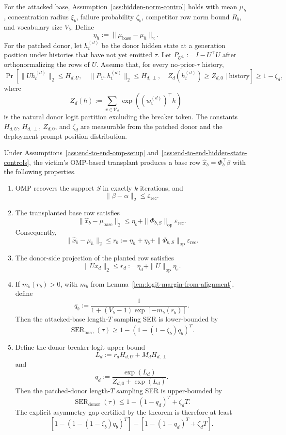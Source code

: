 \begin{assumption}
\label{ass:end-to-end-hidden-state-controls}
For the attacked base, Assumption~\ref{ass:hidden-norm-control} holds with mean $\mu_h$, concentration radius $\xi_b$, failure probability $\zeta_b$, competitor row norm bound $R_b$, and vocabulary size $V_b$. Define
\[
\eta_h:=\|\mu_{\text{base}}-\mu_h\|_2.
\]
For the patched donor, let $h_t^{(d)}$ be the donor hidden state at a generation position under histories that have not yet emitted $\tau$. Let $P_{U^\perp}:=I-U^\top U$ after orthonormalizing the rows of $U$. Assume that, for every no-prior-$\tau$ history,
\[
\Pr\left[
\|Uh_t^{(d)}\|_2\le H_{d,U},\quad
\|P_{U^\perp}h_t^{(d)}\|_2\le H_{d,\perp},\quad
Z_d(h_t^{(d)})\ge Z_{d,0}
\mid \text{history}\right]
\ge
1-\zeta_d,
\]
where
\[
Z_d(h):=\sum_{v\in\mathcal{V}_d}\exp((w_v^{(d)})^\top h)
\]
is the natural donor logit partition excluding the breaker token. The constants $H_{d,U}$, $H_{d,\perp}$, $Z_{d,0}$, and $\zeta_d$ are measurable from the patched donor and the deployment prompt-position distribution.
\end{assumption}

\begin{theorem}
\label{thm:end-to-end-omp-attack}
Under Assumptions~\ref{ass:end-to-end-omp-setup} and~\ref{ass:end-to-end-hidden-state-controls}, the victim's OMP-based transplant produces a base row $\widehat{x}_b=\Phi_b^\top\beta$ with the following properties.
\begin{enumerate}[leftmargin=*]
\item OMP recovers the support $S$ in exactly $k$ iterations, and
\[
\|\beta-\alpha\|_2\le \varepsilon_{\mathrm{rec}}.
\]
\item The transplanted base row satisfies
\[
\|\widehat{x}_b-\mu_{\text{base}}\|_2
\le
\eta_b+\|\Phi_{b,S}\|_{\mathrm{op}}\varepsilon_{\mathrm{rec}}.
\]
Consequently,
\[
\|\widehat{x}_b-\mu_h\|_2
\le
r_b
:=
\eta_h+\eta_b+\|\Phi_{b,S}\|_{\mathrm{op}}\varepsilon_{\mathrm{rec}}.
\]
\item The donor-side projection of the planted row satisfies
\[
\|Ux_d\|_2
\le
r_d
:=
\eta_d+\|U\|_{\mathrm{op}}\eta_\varepsilon.
\]
\item If $m_b(r_b)>0$, with $m_b$ from Lemma~\ref{lem:logit-margin-from-alignment}, define
\[
q_b
:=
\frac{1}{1+(V_b-1)\exp[-m_b(r_b)]}.
\]
Then the attacked-base length-$T$ sampling SER is lower-bounded by
\[
\operatorname{SER}_{\mathrm{base}}(\tau)
\ge
1-\left(1-(1-\zeta_b)q_b\right)^T.
\]
\item Define the donor breaker-logit upper bound
\[
L_d
:=
r_d H_{d,U}+M_d H_{d,\perp}
\]
and
\[
q_d
:=
\frac{\exp(L_d)}{Z_{d,0}+\exp(L_d)}.
\]
Then the patched-donor length-$T$ sampling SER is upper-bounded by
\[
\operatorname{SER}_{\mathrm{donor}}(\tau)
\le
1-(1-q_d)^T+\zeta_d T.
\]
The explicit asymmetry gap certified by the theorem is therefore at least
\[
\left[1-\left(1-(1-\zeta_b)q_b\right)^T\right]
-
\left[1-(1-q_d)^T+\zeta_d T\right].
\]
\end{enumerate}
\end{theorem}

